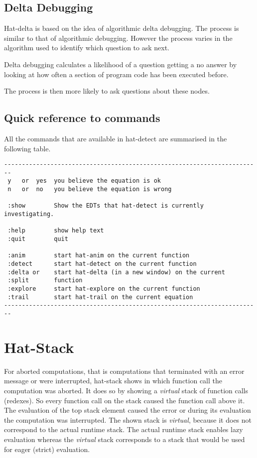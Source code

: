 \documentclass[12pt]{article}
\begin{document}
\subsection{Delta Debugging}

Hat-delta is based on the idea of algorithmic delta debugging.  The process is
similar to that of algorithmic debugging.  However the process varies in the
algorithm used to identify which question to ask next.

Delta debugging calculates a likelihood of a question getting a no answer by
looking at how often a section of program code has been executed before.

The process is then more likely to ask questions about these nodes.

\subsection{Quick reference to commands}

All the commands that are available in hat-detect are summarised in
the following table.

\begin{verbatim}
------------------------------------------------------------------------
 y   or  yes  you believe the equation is ok
 n   or  no   you believe the equation is wrong

 :show        Show the EDTs that hat-detect is currently investigating.

 :help        show help text
 :quit        quit

 :anim        start hat-anim on the current function
 :detect      start hat-detect on the current function
 :delta or    start hat-delta (in a new window) on the current
 :split       function
 :explore     start hat-explore on the current function
 :trail       start hat-trail on the current equation
------------------------------------------------------------------------
\end{verbatim}

\section{Hat-Stack}

For aborted computations, that is computations that terminated with an error message or were interrupted, hat-stack shows in which function call the computation was aborted. It does so by showing a \emph{virtual} stack of function calls (redexes). So every function call on the stack caused the function call above it. The evaluation of the top stack element caused the error or during its evaluation the computation was interrupted. The shown stack is \emph{virtual}, because it does not correspond to the actual runtime stack. The actual runtime stack enables lazy evaluation whereas the \emph{virtual} stack corresponds to a stack that would be used for eager (strict) evaluation.
\end{document}
